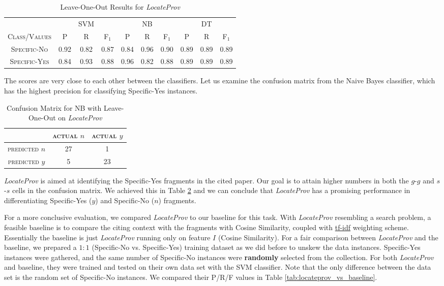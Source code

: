 \begin{table}[h]
	\center
	\begin{tabular}{ c | c  c  c | c c c | c c c}
		& & SVM & & & NB & & & DT \\
		\textsc{Class/Values} & \textsc{P} & \textsc{R} & \textsc{F$_1$} & \textsc{P} & \textsc{R} & \textsc{F$_1$} & \textsc{P} & \textsc{R} & \textsc{F$_1$} \\
		\hline
		\textsc{Specific-No} 			& 0.92  &    0.82   &   0.87 & 0.84   &   0.96   &   0.90 & 0.89  &    0.89  &    0.89 \\
		\textsc{Specific-Yes} 			& 0.84  &    0.93   &   0.88 & 0.96   &   0.82   &   0.88 & 0.89  &    0.89  &    0.89 \\
	\end{tabular}
	\caption{Leave-One-Out Results for {\it LocateProv}}
	\label{tab:secondtieresults}
\end{table}
The scores are very close to each other between the classifiers. Let us examine the confusion matrix from the Naive Bayes classifier, which has the highest precision for classifying Specific-Yes instances.

\begin{table}[h]
	\center
	\begin{tabular}{ c | c  c }
		 & \textsc{actual $n$} & \textsc{actual $y$} \\
		\hline
		\textsc{predicted $n$} 	& 27 & 1 \\
		\textsc{predicted $y$}		& 5 & 23
	\end{tabular}
	\caption{Confusion Matrix for NB with Leave-One-Out on {\it LocateProv}}
	\label{tab:secondnbconfusionmatrix}
\end{table}
{\it LocateProv} is aimed at identifying the Specific-Yes fragments in the cited paper. Our goal is to attain higher numbers in both the $g$-$g$ and $s$-$s$ cells in the confusion matrix. We achieved this in Table \ref{tab:secondnbconfusionmatrix} and we can conclude that {\it LocateProv} has a promising performance in differentiating Specific-Yes ($y$) and Specific-No ($n$) fragments.

For a more conclusive evaluation, we compared {\it LocateProv} to our baseline for this task. With {\it LocateProv} resembling a search problem, a feasible baseline is to compare the citing context with the fragments with Cosine Similarity, coupled with \url{tf-idf} \cite{irtextbook} weighting scheme. Essentially the baseline is just {\it LocateProv} running only on feature $I$ (Cosine Similarity). For a fair comparison between {\it LocateProv} and the baseline, we prepared a $1:1$ (Specific-No vs. Specific-Yes) training dataset as we did before to unskew the data instances. Specific-Yes instances were gathered, and the same number of Specific-No instances were {\bf randomly} selected from the collection. For both {\it LocateProv} and baseline, they were trained and tested on their own data set with the SVM classifier. Note that the only difference between the data set is the random set of Specific-No instances. We compared their P/R/F values in Table \ref{tab:locateprov_vs_baseline}.

